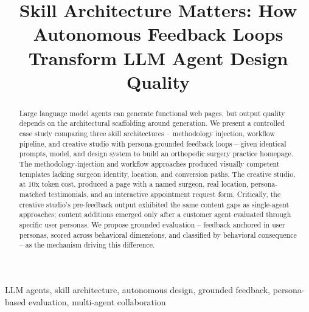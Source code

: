 \documentclass[conference]{IEEEtran}
\begin{document}
\title{Skill Architecture Matters: How Autonomous Feedback Loops Transform LLM Agent Design Quality}

\author{%
\and
{}
}

\maketitle

\begin{abstract}
Large language model agents can generate functional web pages, but output quality depends on the architectural scaffolding around generation. We present a controlled case study comparing three skill architectures -- methodology injection, workflow pipeline, and creative studio with persona-grounded feedback loops -- given identical prompts, model, and design system to build an orthopedic surgery practice homepage. The methodology-injection and workflow approaches produced visually competent templates lacking surgeon identity, location, and conversion paths. The creative studio, at 10x token cost, produced a page with a named surgeon, real location, persona-matched testimonials, and an interactive appointment request form. Critically, the creative studio's pre-feedback output exhibited the same content gaps as single-agent approaches; content additions emerged only after a customer agent evaluated through specific user personas. We propose grounded evaluation -- feedback anchored in user personas, scored across behavioral dimensions, and classified by behavioral consequence -- as the mechanism driving this difference.
\end{abstract}

\begin{IEEEkeywords}
LLM agents, skill architecture, autonomous design, grounded feedback, persona-based evaluation, multi-agent collaboration
\end{IEEEkeywords}
\end{document}

